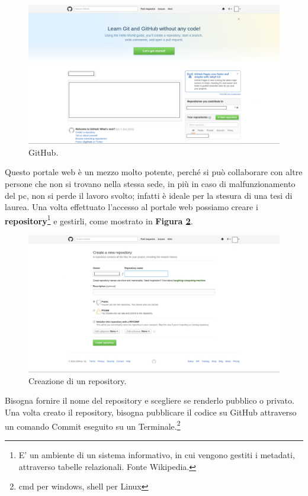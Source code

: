 \documentclass[a4paper,11pt]{article}
\begin{document}
\begin{figure}[!htpb]
	\centering
	\includegraphics[scale=0.30]{github.png}
	\caption{GitHub.}
	\label{fig:12}
\end{figure}
Questo portale web è un mezzo molto potente, perché si può collaborare con altre persone che non si trovano nella stessa sede, in più in caso di malfunzionamento del pc, non si perde il lavoro svolto; infatti è ideale per la stesura di una tesi di laurea.\newline
Una volta effettuato l'accesso al portale web possiamo creare i \textbf{repository}\footnote{E' un ambiente di un sistema informativo, in cui vengono gestiti i metadati, attraverso tabelle relazionali. Fonte Wikipedia.} e gestirli, come mostrato in \textbf{Figura \ref{fig:13}}.
\begin{figure}[!htpb]
	\centering
	\includegraphics[scale=0.30]{github2.png}
	\caption{Creazione di un repository.}
	\label{fig:13}
\end{figure}
\newline
Bisogna fornire il nome del repository e scegliere se renderlo pubblico o privato.
Una volta creato il repository, bisogna pubblicare il codice su GitHub attraverso un comando Commit eseguito su un Terminale.\footnote{cmd per windows, shell per Linux}
\end{document}
